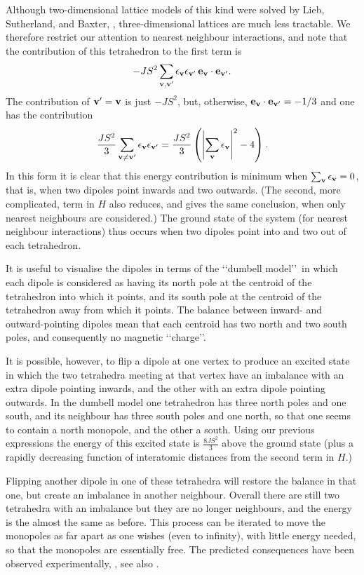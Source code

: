 \documentclass[11pt]{article}
\begin{document}
Although two-dimensional lattice models of this kind were solved by Lieb, Sutherland, and Baxter, \cite[Ch. 8,9]{B82}, three-dimensional lattices are much less tractable. 
We therefore restrict our attention to nearest neighbour interactions, and note that the contribution of this tetrahedron to the first term is 
$$
-JS^2\sum_{{\bf v},{\bf v}^\prime} \epsilon_{\bf v} \epsilon_{{\bf v}^\prime}\,{\bf e}_{{\bf v}}\cdot {\bf e}_{{\bf v}^\prime}.
$$
The contribution of ${\bf v}^\prime ={\bf v}$ is just $-JS^2$, but, otherwise, ${\bf e}_{{\bf v}}\cdot {\bf e}_{{\bf v}^\prime} = -1/3$
and one has the contribution
$$
\frac{JS^2}3 \sum_{{\bf v}\neq {\bf v}^\prime} \epsilon_{{\bf v}} \epsilon_{{\bf v}^\prime}
= \frac{JS^2}3 \left(\left|\sum_{{\bf v}} \epsilon_{{\bf v}}\right|^2  - 4\right).
$$
In this form it is clear that this energy contribution is minimum when $\sum_{{\bf v}} \epsilon_{{\bf v}} = 0$, that is, when two dipoles point inwards and two outwards.  (The second, more complicated, term in $H$ also reduces, and gives the same conclusion, when only nearest neighbours are considered.)
The ground state of the system (for nearest neighbour interactions) thus occurs when two dipoles point into and two out of each tetrahedron.
 
It is useful to visualise the dipoles in terms of the \lq\lq dumbell model\rq\rq\, in which each dipole is considered as having its north pole at the centroid of the tetrahedron into which it points, and its south pole at the centroid of the tetrahedron away from which it points.
The balance between inward- and outward-pointing dipoles mean that each centroid has two north and two south poles, and consequently no magnetic \lq\lq charge\rq\rq.

It is possible, however, to flip a dipole at one vertex to produce an excited state in which the two  tetrahedra meeting at that vertex have an imbalance with an extra dipole pointing inwards, and the other with an extra dipole pointing outwards. In the dumbell model  one tetrahedron has  three north poles and one south, 
and its neighbour has three south poles and one north, so that one seems to contain a north monopole, and the other a south.
Using our previous expressions the energy of this excited state is $\frac{8JS^2}3$ above the ground state (plus a rapidly decreasing function of interatomic distances from the second term in $H$.)

Flipping another dipole in one of these tetrahedra will restore the balance in that one, but create an imbalance in another neighbour. Overall there are still two tetrahedra with an imbalance but they are no longer neighbours, and the energy is the almost the same as before. This process can be iterated to move the monopoles as far apart as one wishes (even to infinity), with little energy needed, so that the monopoles are essentially free. 
The predicted consequences have been observed experimentally, \cite{C08},  see also \cite{BG02,JH10}.
\end{document}
